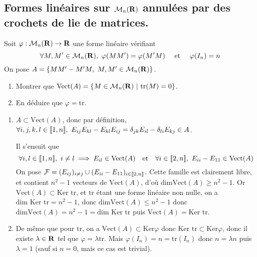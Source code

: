 \subsection{Formes linéaires sur $\mathcal M_n(\operatorname{\mathbf{R}})$ annulées par des crochets de lie de matrices.}

\begin{exercice}
    Soit $\varphi : \mathcal M_n(\operatorname{\mathbf{R}})\to \operatorname{\mathbf{R}}$ une forme linéaire vérifiant
    \[\forall M,M'\in \mathcal M_n(\R),\ \varphi(MM')=\varphi(M'M)\quad \text{ et }\quad \varphi(I_n)=n\]
    On pose $A=\lbrace MM'-M'M,\ M,M'\in \mathcal M_n(\operatorname{\mathbf{R}})\rbrace$. 
    \begin{enumerate}
        \item Montrer que $\text{Vect}(A)=\lbrace M\in \mathcal M_n(\operatorname{\mathbf{R}})\ |\ \text{tr}(M)=0\rbrace$.
        \item En déduire que $\varphi=\text{tr}$.
    \end{enumerate}
\end{exercice}

\begin{correction}\hfill
    \begin{enumerate}
        \item $A\subset \text{Vect}(A)$, donc par définition, $\forall i,j,k,l\in\inl{1}{n},\ E_{ij}E_{kl}-E_{kl}E_{ij}=\delta_{jk}E_{il}-\delta_{li}E_{kj}\in A$. 
    
        Il s'ensuit que
        \[\forall i,l\in\inl1n,\ i\neq l\implies E_{il}\in \text{Vect}(A)\quad \text{et}\quad \forall i\in\inl{2}{n},\ E_{ii}-E_{11}\in \text{Vect}(A)\]
        On pose $\mathcal F=(E_{ij})_{i\neq j}\cup(E_{ii}-E_{11})_{i\in[\![2,n]\!]}$. Cette famille est clairement libre, et contient $n^2-1$ vecteurs de $\text{Vect}(A)$, d'où $\text{dim}\text{Vect}(A)\geq n^2-1$. Or $\text{Vect}(A)\subset \text{Ker tr}$, et $\text{tr}$ étant une forme linéaire non nulle, on a $\text{dim } \text{Ker tr}=n^2-1$, donc $\text{dim} \text{Vect}(A)\leq n^2-1$ donc $\text{dim} \text{Vect}(A)=n^2-1=\text{dim}\text{ Ker tr}$ puis $\text{Vect}(A)=\text{Ker tr}$.
        \item De même que pour $\text{tr}$, on a $\text{Vect}(A)\subset \text{Ker}\varphi$ donc $\text{Ker tr}\subset \text{Ker}\varphi$, donc il existe $\lambda\in\operatorname{\mathbf{R}}$ tel que $\varphi=\lambda\text{tr}$. Mais $\varphi(I_n)=n=\text{tr}(I_n)$ donc $n=\lambda n$ puis $\lambda = 1$ (sauf si $n=0$, mais ce cas est trivial).
    \end{enumerate}
\end{correction}

